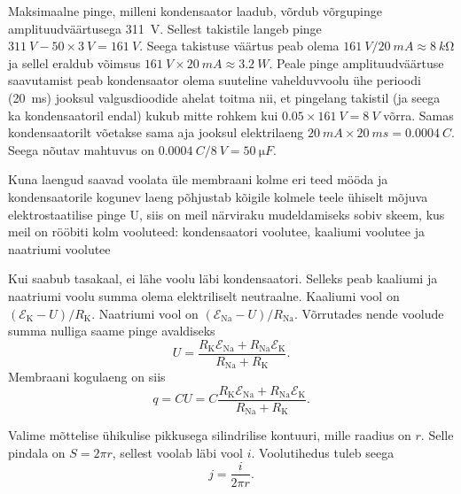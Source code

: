 \documentclass[10pt, twoside]{article}
\begin{document}
{%

\solu
Maksimaalne pinge, milleni kondensaator laadub, võrdub võrgupinge
amplituudväärtusega \SI{311}{V}. Sellest takistile langeb pinge
$\SI{311}{V}-\num{50}\times\SI{3}{V}=\SI{161}{V}$. Seega takistuse väärtus peab olema
$\SI{161}{V}/\SI{20}{mA}\approx\SI{8}{k\ohm}$ ja sellel eraldub võimsus
$\SI{161}{V}\times\SI{20}{mA}\approx\SI{3.2}{W}$. Peale pinge amplituudväärtuse
saavutamist peab kondensaator olema suuteline vahelduvvoolu ühe perioodi (\SI{20}{ms})
jooksul valgusdioodide ahelat toitma nii, et pingelang takistil (ja seega ka
kondensaatoril endal) kukub mitte rohkem kui $\num{0.05}\times\SI{161}{V}=\SI{8}{V}$
võrra. Samas kondensaatorilt võetakse sama aja jooksul elektrilaeng
$\SI{20}{mA}\times\SI{20}{ms}=\SI{0.0004}{C}$. Seega nõutav mahtuvus on
$\SI{0.0004}{C}/\SI{8}{V}=\SI{50}{\micro F}$.
\probend
\bigskip


\solu
Kuna laengud saavad voolata üle membraani kolme eri teed mööda ja kondensaatorile kogunev laeng põhjustab kõigile kolmele teele ühiselt mõjuva elektrostaatilise
pinge U, siis on meil närviraku mudeldamiseks sobiv skeem, kus meil on rööbiti kolm
vooluteed: kondensaatori voolutee, kaaliumi voolutee ja naatriumi voolutee


Kui saabub tasakaal, ei lähe voolu läbi kondensaatori. Selleks peab kaaliumi ja naatriumi voolu summa olema elektriliselt neutraalne. Kaaliumi vool on $(\mathcal{E}_{\mathrm{K}} - U)/R_\mathrm{K}$.
Naatriumi vool on $(\mathcal{E}_{\mathrm{Na}} - U)/R_{\mathrm{Na}}$. Võrrutades nende voolude summa nulliga saame
pinge avaldiseks
\[
U=\frac{R_{\mathrm{K}} \mathcal{E}_{\mathrm{Na}}+R_{\mathrm{Na}} \mathcal{E}_{\mathrm{K}}}{R_{\mathrm{Na}}+R_{\mathrm{K}}}.
\]
Membraani kogulaeng on siis
\[
q=C U=C \frac{R_{\mathrm{K}} \mathcal{E}_{\mathrm{Na}}+R_{\mathrm{Na}} \mathcal{E}_{\mathrm{K}}}{R_{\mathrm{Na}}+R_{\mathrm{K}}}.
\]
\probend
\bigskip


\solu
Valime mõttelise ühikulise pikkusega silindrilise kontuuri, mille raadius on $r$. Selle
pindala on $S = 2\pi r$, sellest voolab läbi vool $i$. Voolutihedus tuleb seega
\[
j = \frac{i}{2\pi r}.
\]
\probend
\bigskip

}
\end{document}
